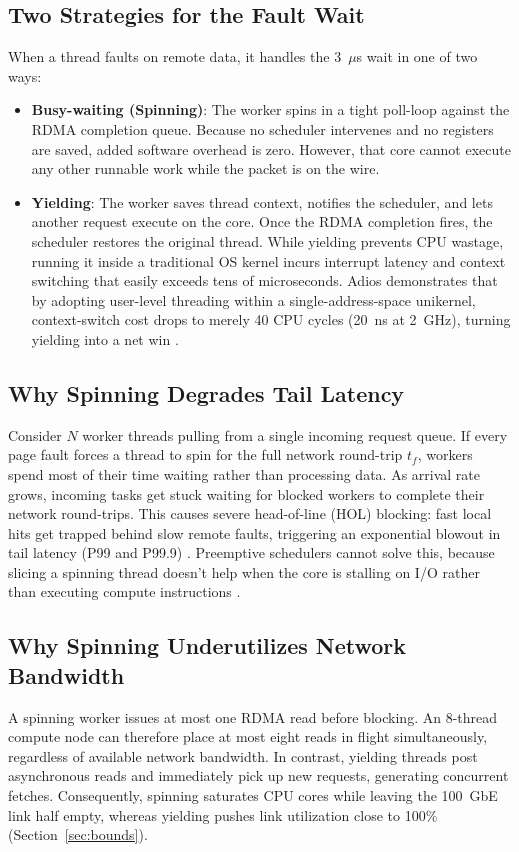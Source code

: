 \subsection{Two Strategies for the Fault Wait}
When a thread faults on remote data, it handles the 3~$\mu$s wait in one of two ways:
\begin{itemize}
\item \textbf{Busy-waiting (Spinning)}: The worker spins in a tight poll-loop against the RDMA completion queue. Because no scheduler intervenes and no registers are saved, added software overhead is zero. However, that core cannot execute any other runnable work while the packet is on the wire.
\item \textbf{Yielding}: The worker saves thread context, notifies the scheduler, and lets another request execute on the core. Once the RDMA completion fires, the scheduler restores the original thread. While yielding prevents CPU wastage, running it inside a traditional OS kernel incurs interrupt latency and context switching that easily exceeds tens of microseconds. Adios demonstrates that by adopting user-level threading within a single-address-space unikernel, context-switch cost drops to merely 40 CPU cycles (20~ns at 2~GHz), turning yielding into a net win \cite{adios,capriccio,arachne,shenango}.
\end{itemize}

\subsection{Why Spinning Degrades Tail Latency}
Consider $N$ worker threads pulling from a single incoming request queue. If every page fault forces a thread to spin for the full network round-trip $t_f$, workers spend most of their time waiting rather than processing data. As arrival rate grows, incoming tasks get stuck waiting for blocked workers to complete their network round-trips. This causes severe head-of-line (HOL) blocking: fast local hits get trapped behind slow remote faults, triggering an exponential blowout in tail latency (P99 and P99.9) \cite{zygos,shinjuku}. Preemptive schedulers cannot solve this, because slicing a spinning thread doesn't help when the core is stalling on I/O rather than executing compute instructions \cite{adios}.

\subsection{Why Spinning Underutilizes Network Bandwidth}
A spinning worker issues at most one RDMA read before blocking. An 8-thread compute node can therefore place at most eight reads in flight simultaneously, regardless of available network bandwidth. In contrast, yielding threads post asynchronous reads and immediately pick up new requests, generating concurrent fetches. Consequently, spinning saturates CPU cores while leaving the 100~GbE link half empty, whereas yielding pushes link utilization close to 100\% (Section~\ref{sec:bounds}).

